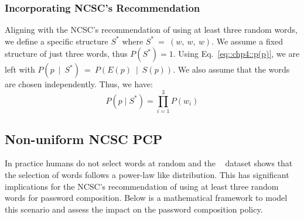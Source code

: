 
\subsubsection{Incorporating NCSC's Recommendation}
Aligning with the NCSC's recommendation of using at least three random words, we define a specific structure $S^*$ where $S^*~=~(w,~w,~w)$. We assume a fixed structure of just three words, thus $P(S^*) = 1$. Using Eq.~\ref{eq::chp4::p(p)}, we are left with $P(p~\mid~S^*)~=~P(E(p)~\mid~S(p))$. We also assume that the words are chosen independently. Thus, we have:
\begin{equation}
P(p \mid S^*) = \prod_{i=1}^{3} P(w_i)
\end{equation}
   
   

\subsection{Non-uniform NCSC PCP}
\vspace*{-0.1cm}
In practice humans do not select words at random and the \pwdninja~\cite{almasi2024passwordninja} dataset shows that the selection of words follows a power-law like distribution. This has significant implications for the NCSC's recommendation of using at least three random words for password composition. Below is a mathematical framework to model this scenario and assess the impact on the password composition policy.

